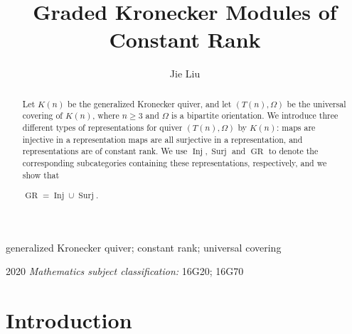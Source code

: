 \documentclass[a4paper,12pt]{amsart}
\title{Graded Kronecker Modules of Constant Rank }
\author{Jie Liu}
\DeclareMathOperator{\Inj}{Inj}
\DeclareMathOperator{\Sur}{Surj}
\DeclareMathOperator{\GR}{GR}
\begin{document}
 
\rmfamily
 


\maketitle








\begin{abstract}






Let $K(n)$ be the generalized Kronecker quiver, and let  $(T(n),\Omega)$ be the universal covering of $K(n)$, where $n\geq 3$ and $\Omega$ is a bipartite orientation. We introduce three different types of representations for quiver $(T(n),\Omega)$ by $K(n)$: maps are injective in a representation maps are all surjective in a representation, and representations are of constant rank. We use $\Inj, \Sur$ and $\GR$ to denote the corresponding subcategories containing these representations, respectively, and we show that 


 
\begin{center}
 $\GR= \Inj\cup\Sur$.
\end{center}





\end{abstract}
\providecommand{\keywords}[1]
{
  \small	
  \textbf{} #1
}
\keywords{generalized Kronecker quiver; constant rank; universal covering}

2020  \textit{Mathematics subject classification:} 	16G20; 	16G70
 







\section{Introduction}
\end{document}
